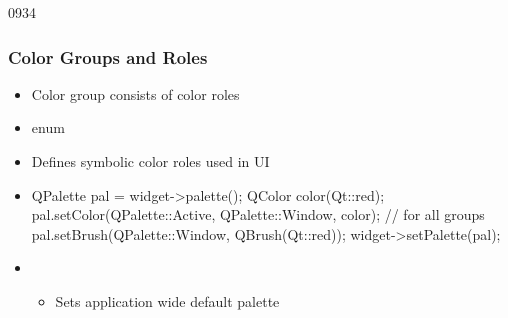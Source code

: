 \begin{slide}[fragile]{0934}\frametitle{Color Groups and Roles}
\begin{itemize}
  \item Color group consists of color roles
  \item enum 
  \item Defines symbolic color roles used in UI
\end{itemize}
\begin{itemize}
  \item[] \begin{cpp}
QPalette pal = widget->palette();               
QColor color(Qt::red);
pal.setColor(QPalette::Active, QPalette::Window, color);
// for all groups
pal.setBrush(QPalette::Window, QBrush(Qt::red));
widget->setPalette(pal);
  \end{cpp}  
  \item {}
  \begin{itemize}
    \item Sets application wide default palette
  \end{itemize} 
\end{itemize}
\end{slide}  
